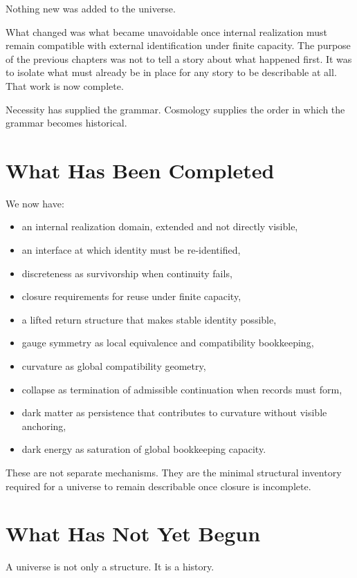 \documentclass[11pt,twoside,openright]{book}
\begin{document}
Nothing new was added to the universe.

What changed was what became unavoidable once internal realization must remain compatible with external identification under finite capacity. The purpose of the previous chapters was not to tell a story about what happened first. It was to isolate what must already be in place for any story to be describable at all. That work is now complete.

Necessity has supplied the grammar.
Cosmology supplies the order in which the grammar becomes historical.

\section*{What Has Been Completed}

We now have:

\begin{itemize}
\item an internal realization domain, extended and not directly visible,
\item an interface at which identity must be re-identified,
\item discreteness as survivorship when continuity fails,
\item closure requirements for reuse under finite capacity,
\item a lifted return structure that makes stable identity possible,
\item gauge symmetry as local equivalence and compatibility bookkeeping,
\item curvature as global compatibility geometry,
\item collapse as termination of admissible continuation when records must form,
\item dark matter as persistence that contributes to curvature without visible anchoring,
\item dark energy as saturation of global bookkeeping capacity.
\end{itemize}

These are not separate mechanisms. They are the minimal structural inventory required for a universe to remain describable once closure is incomplete.

\section*{What Has Not Yet Begun}

A universe is not only a structure. It is a history.
\end{document}
